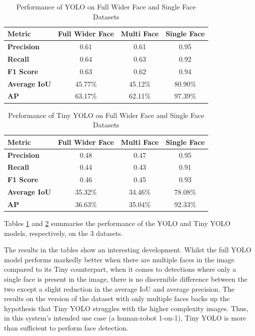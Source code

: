 \begin{table}[h!]
\centering
\caption{Performance of YOLO on Full Wider Face and Single Face Datasets}
\begin{tabular}{|l|c|c|c|}
\hline
\textbf{Metric}      & \textbf{Full Wider Face} & \textbf{Multi Face}  & \textbf{Single Face} \\ \hline
\textbf{Precision}   & 0.61        & 0.61            & 0.95                 \\ \hline
\textbf{Recall}      & 0.64        & 0.63            & 0.92                 \\ \hline
\textbf{F1 Score}    & 0.63        & 0.62            & 0.94                 \\ \hline
\textbf{Average IoU} & 45.77\%     & 45.12\%            & 80.90\%              \\ \hline
\textbf{AP}          & 63.17\%     & 62.11\%              & 97.39\%              \\ \hline
\end{tabular}
\label{tab:YOLO}
\end{table}

\begin{table}[h!]
\centering
\caption{Performance of Tiny YOLO on Full Wider Face and Single Face Datasets}
\begin{tabular}{|l|c|c|c|}
\hline
\textbf{Metric}      & \textbf{Full Wider Face} & \textbf{Multi Face}  & \textbf{Single Face} \\ \hline
\textbf{Precision}   & 0.48        & 0.47            & 0.95                 \\ \hline
\textbf{Recall}      & 0.44        & 0.43            & 0.91                 \\ \hline
\textbf{F1 Score}    & 0.46        & 0.45            & 0.93                 \\ \hline
\textbf{Average IoU} & 35.32\%     & 34.46\%            & 78.08\%              \\ \hline
\textbf{AP}          & 36.63\%     & 35.04\%             & 92.33\%              \\ \hline
\end{tabular}

\label{tab:TINYYOLO}
\end{table}

Tables \ref{tab:YOLO} and \ref{tab:TINYYOLO} summarise the performance of the YOLO and Tiny YOLO models, respectively, on the 3 datasets.

The results in the tables show an interesting development. Whilst the full YOLO model performs markedly better when there are multiple faces in the image compared to its Tiny counterpart, when it comes to detections where only a single face is present in the image, there is no discernible difference between the two except a slight reduction in the average IoU and average precision. The results on the version of the dataset with only multiple faces backs up the hypothesis that Tiny YOLO struggles with the higher complexity images. Thus, in this system's intended use case (a human-robot 1-on-1), Tiny YOLO is more than sufficient to perform face detection.

